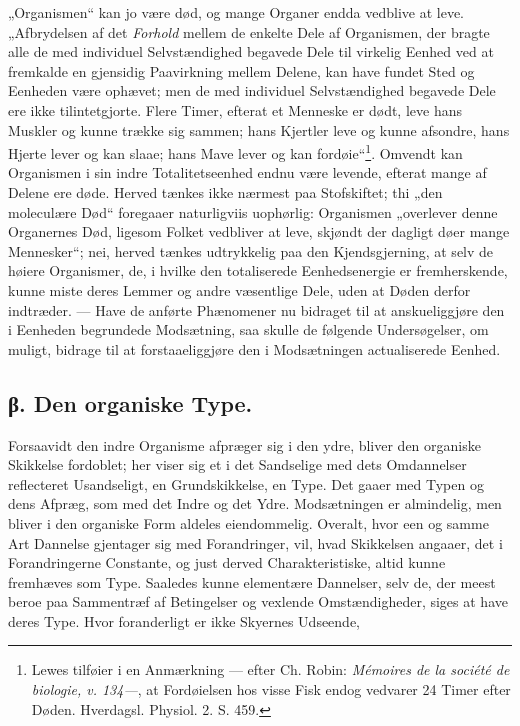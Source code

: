 \documentclass[12pt,a4paper]{book}
\begin{document}
„Organismen“ kan jo være død, og mange Organer endda vedblive at leve.
„Afbrydelsen af det \emph{Forhold} mellem de enkelte Dele af Organismen, der
bragte alle de med individuel Selvstændighed begavede Dele til virkelig
Eenhed ved at fremkalde en gjensidig Paavirkning mellem Delene, kan have
fundet Sted og Eenheden være ophævet; men de med individuel
Selvstændighed begavede Dele ere ikke tilintetgjorte. Flere Timer,
efterat et Menneske er dødt, leve hans Muskler og kunne trække sig
sammen; hans Kjertler leve og kunne afsondre, hans Hjerte lever og kan
slaae; hans Mave lever og
\setcounter{footnote}{0}
kan fordøie“\footnote{Lewes tilføier i en Anmærkning --- efter Ch. Robin:
\textit{Mémoires de la société de biologie, v. 134---}, at Fordøielsen
hos visse Fisk endog vedvarer 24 Timer efter Døden. Hverdagsl. Physiol.
2. S. 459.}. Omvendt kan Organismen i sin indre Totalitetseenhed endnu
være levende, efterat mange af Delene ere døde. Herved tænkes ikke
nærmest paa Stofskiftet; thi „den moleculære Død“ foregaaer naturligviis
uophørlig: Organismen „overlever denne Organernes Død, ligesom Folket
vedbliver at leve, skjøndt der dagligt døer mange Mennesker“; nei,
herved tænkes udtrykkelig paa den Kjendsgjerning, at selv de høiere
Organismer, de, i hvilke den totaliserede Eenhedsenergie er
fremherskende, kunne miste deres Lemmer og andre væsentlige Dele, uden
at Døden derfor indtræder. --- Have de anførte Phænomener nu bidraget
til at anskueliggjøre den i Eenheden begrundede Modsætning, saa skulle
de følgende Undersøgelser, om muligt, bidrage til at forstaaeliggjøre
den i Modsætningen actualiserede Eenhed.

\subsection*{β. Den organiske Type.}

Forsaavidt den indre Organisme afpræger sig i den ydre, bliver den
organiske Skikkelse fordoblet; her viser sig et i det Sandselige med
dets Omdannelser reflecteret Usandseligt, en Grundskikkelse, en Type.
Det gaaer med Typen og dens Afpræg, som med det Indre og det Ydre.
Modsætningen er almindelig, men bliver i den organiske Form aldeles
eiendommelig. Overalt, hvor een og samme Art Dannelse gjentager sig med
Forandringer, vil, hvad Skikkelsen angaaer, det i Forandringerne
Constante, og just derved Charakteristiske, altid kunne fremhæves som
Type. Saaledes kunne elementære Dannelser, selv de, der meest beroe paa
Sammentræf af Betingelser og vexlende Omstændigheder, siges at have
deres Type. Hvor foranderligt er ikke Skyernes Udseende,
\end{document}

